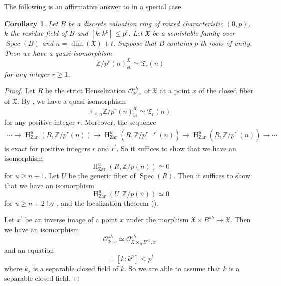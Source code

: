 \documentclass{article}
\newtheorem{cor}[thm]{\indent \sc Corollary}
\newcommand{\spec}{\operatorname{Spec}}
\newcommand{\et}{\mathrm{\acute{e}t}}
\newcommand{\Zar}{\mathrm{Zar}}
\newcommand{\HO}{\operatorname{H}}
\begin{document}
The following is an affirmative answer to \cite[p.524, Conjecture 1.4.1]{SaP} in a special case.

%
\begin{cor}\upshape
Let $B$ be a discrete valuation ring of mixed characteristic $(0, p)$, 
$k$ the residue field of $B$ and $[k:k^{p}]\leq p^{t}$. 
Let $\mathfrak{X}$ be a semistable family over
$\spec(B)$ and $n=\operatorname{dim}(\mathfrak{X})+t$. Suppose that 
$B$ contains $p$-th roots of unity. Then we have a quasi-isomorphism
%
\begin{equation*}
\mathbb{Z}/p^{r}(n)_{\et}^{\mathfrak{X}}
\simeq 
\mathfrak{T}_{r}(n)
\end{equation*}
%
for any integer $r\geq 1$.
\end{cor}
%

%
\begin{proof}\upshape
Let $R$ be the strict Henselization $\mathcal{O}_{\mathfrak{X}, x}^{sh}$
of $\mathfrak{X}$ at a point $x$ of the closed fiber of $\mathfrak{X}$.
By \cite[p.209, Remark 7.2]{SaR}, we have a quasi-isomorphism
%
\begin{equation*}
\tau_{\leq n}\mathbb{Z}/p^{r}(n)_{\et}^{\mathfrak{X}}  
\simeq
\mathfrak{T}_{r}(n)
\end{equation*}
%
for any positive integer $r$. Moreover, the sequence
%
\begin{align*}
\cdots\to  
\HO^{u}_{\Zar}(R, \mathbb{Z}/p^{r}(n))
\to
\HO^{u}_{\Zar}(R, \mathbb{Z}/p^{r+r^{\prime}}(n))
\to
\HO^{u}_{\Zar}(R, \mathbb{Z}/p^{r^{\prime}}(n))
\to
\cdots
\end{align*}
%
is exact for positive integers $r$ and $r^{\prime}$. So it suffices to show that we have an isomorphism
%
\begin{equation*}
\HO^{u}_{\Zar}(
R, \mathbb{Z}/p(n)
)    
\simeq 0
\end{equation*}
%
for $u\geq n+1$. Let $U$ be the generic fiber of $\spec(R)$. Then it suffices to show that
we have an isomorphism
%
\begin{equation*}
\HO^{u}_{\Zar}(
U, \mathbb{Z}/p(n)
)    
\simeq 
0
\end{equation*}
%
for $u\geq n+2$ by 
\cite[Proposition 1.5]{Sak4}, \cite[Proposition 2.1]{Sak4} 
and the localization theorem (\cite[p.779, Theorem 3.2]{Ge}).

Let $x^{\prime}$ be an inverse image of a point $x$ under the morphism
%
\begin{math}
\mathfrak{X}\times B^{sh}
\to
\mathfrak{X}.
\end{math}
%
Then we have an isomorphism
%
\begin{equation*}
\mathcal{O}^{sh}_{\mathfrak{X}, x}
\simeq 
\mathcal{O}^{sh}_{\mathfrak{X}\times_{B}B^{sh}, x^{\prime}}
\end{equation*}
%
and an equation
%
\begin{equation*}
[k_{s}: k^{p}_{s}]=[k: k^{p}]\leq p^{t}    
\end{equation*}
%
where $k_{s}$ is a separable closed field of $k$. So we are able to assume that 
$k$ is a separable closed field.


\end{proof}
\end{document}
